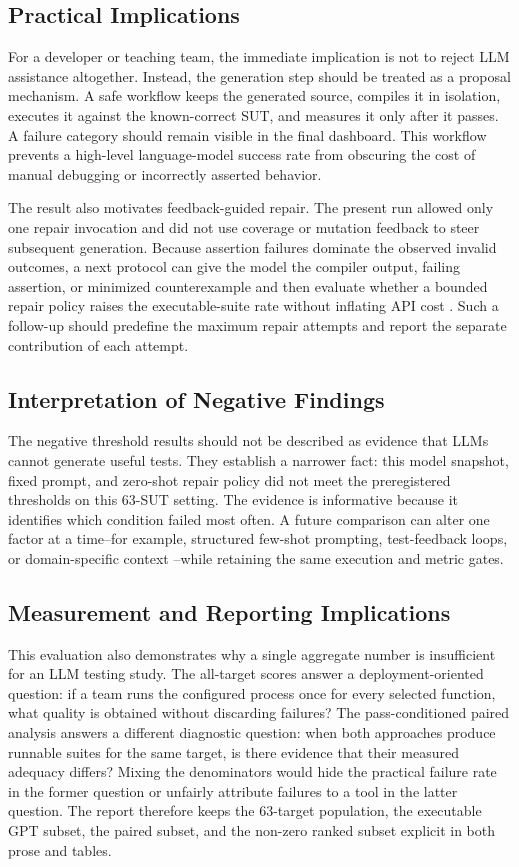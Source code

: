 \subsection{Practical Implications}
For a developer or teaching team, the immediate implication is not to reject LLM assistance altogether. Instead, the generation step should be treated as a proposal mechanism. A safe workflow keeps the generated source, compiles it in isolation, executes it against the known-correct SUT, and measures it only after it passes. A failure category should remain visible in the final dashboard. This workflow prevents a high-level language-model success rate from obscuring the cost of manual debugging or incorrectly asserted behavior.

The result also motivates feedback-guided repair. The present run allowed only one repair invocation and did not use coverage or mutation feedback to steer subsequent generation. Because assertion failures dominate the observed invalid outcomes, a next protocol can give the model the compiler output, failing assertion, or minimized counterexample and then evaluate whether a bounded repair policy raises the executable-suite rate without inflating API cost \cite{yang2025react, pham2025llmloop}. Such a follow-up should predefine the maximum repair attempts and report the separate contribution of each attempt.

\subsection{Interpretation of Negative Findings}
The negative threshold results should not be described as evidence that LLMs cannot generate useful tests. They establish a narrower fact: this model snapshot, fixed prompt, and zero-shot repair policy did not meet the preregistered thresholds on this 63-SUT setting. The evidence is informative because it identifies which condition failed most often. A future comparison can alter one factor at a time--for example, structured few-shot prompting, test-feedback loops, or domain-specific context \cite{vy2025whatinputs}--while retaining the same execution and metric gates.

\subsection{Measurement and Reporting Implications}
This evaluation also demonstrates why a single aggregate number is insufficient for an LLM testing study. The all-target scores answer a deployment-oriented question: if a team runs the configured process once for every selected function, what quality is obtained without discarding failures? The pass-conditioned paired analysis answers a different diagnostic question: when both approaches produce runnable suites for the same target, is there evidence that their measured adequacy differs? Mixing the denominators would hide the practical failure rate in the former question or unfairly attribute failures to a tool in the latter question. The report therefore keeps the 63-target population, the executable GPT subset, the paired subset, and the non-zero ranked subset explicit in both prose and tables.

